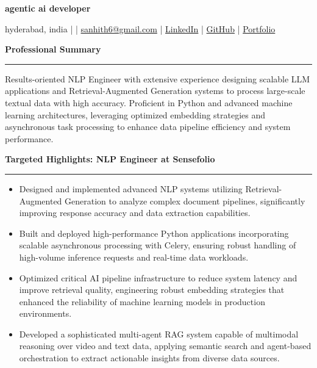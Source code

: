 \documentclass[9pt, letterpaper]{article}
\newcommand{\name}[1]{%
    \begin{center}
        {\LARGE \textbf{#1}}
    \end{center}
}
\newcommand{\sectionheading}[1]{%
    \vspace{4pt}%
    {\large \textbf{#1}}%
    \vspace{1pt}%
    \hrule
    \vspace{2pt}%
}
\begin{document}
\name{agentic ai developer}
\begin{center}
    hyderabad, india \quad |  \quad | \quad
    \href{mailto:sanhith6@gmail.com}{sanhith6@gmail.com} \quad | \quad
    \href{https://www.linkedin.com/in/sanhith-reddy-740a1625b/}{LinkedIn} \quad | \quad
    \href{https://github.com/tsanhith}{GitHub} \quad | \quad
    \href{https://johndoe.dev}{Portfolio}
\end{center}

\vspace{0pt}

\sectionheading{Professional Summary}
Results-oriented NLP Engineer with extensive experience designing scalable LLM applications and Retrieval-Augmented Generation systems to process large-scale textual data with high accuracy. Proficient in Python and advanced machine learning architectures, leveraging optimized embedding strategies and asynchronous task processing to enhance data pipeline efficiency and system performance.

\sectionheading{Targeted Highlights: NLP Engineer at Sensefolio}
\begin{itemize}[leftmargin=0.25in, itemindent=-0.15in, label={--}]
    \item Designed and implemented advanced NLP systems utilizing Retrieval-Augmented Generation to analyze complex document pipelines, significantly improving response accuracy and data extraction capabilities.
    \item Built and deployed high-performance Python applications incorporating scalable asynchronous processing with Celery, ensuring robust handling of high-volume inference requests and real-time data workloads.
    \item Optimized critical AI pipeline infrastructure to reduce system latency and improve retrieval quality, engineering robust embedding strategies that enhanced the reliability of machine learning models in production environments.
    \item Developed a sophisticated multi-agent RAG system capable of multimodal reasoning over video and text data, applying semantic search and agent-based orchestration to extract actionable insights from diverse data sources.
\end{itemize}
\end{document}
